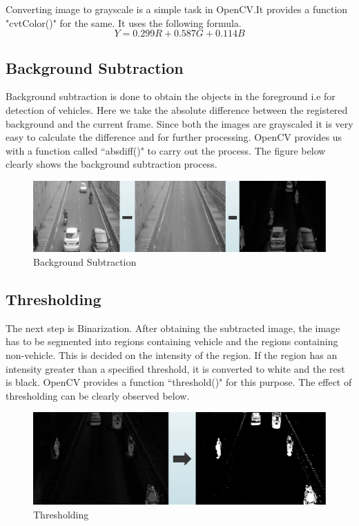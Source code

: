 \documentclass[12pt, a4paper]{article}
\begin{document}
\hspace{3cm}
Converting image to grayscale is a simple task in OpenCV.It provides a function "cvtColor()" for the same. It uses the following formula.\\
\[ Y = 0.299 R + 0.587 G + 0.114 B \]
\begin{large}\subsection{Background Subtraction}\end{large}
\hspace{3cm}
Background subtraction is done to obtain the objects in the foreground i.e for detection of vehicles. Here we take the absolute difference between the registered background and the current frame. Since both the images are grayscaled it is very easy to calculate the difference and for further processing. OpenCV provides us with a function called ``absdiff()" to carry out the process. The figure below clearly shows the background subtraction process. 
\begin{figure}[h!]\includegraphics[width=\linewidth]{subtraction.png}\caption{Background Subtraction}\end{figure}
\begin{large}\subsection{Thresholding}\end{large}
\hspace{3cm}
The next step is Binarization. After obtaining the subtracted image, the image has to be segmented into regions containing vehicle and the regions containing non-vehicle. This is decided on the intensity of the region. If the region has an intensity greater than a specified threshold, it is converted to white and the rest is black. OpenCV provides a function ``threshold()" for this purpose. The effect of thresholding can be clearly observed below.
\begin{figure}[h!]\includegraphics[width=\linewidth]{threshold.png}\caption{Thresholding}\end{figure}
\end{document}
